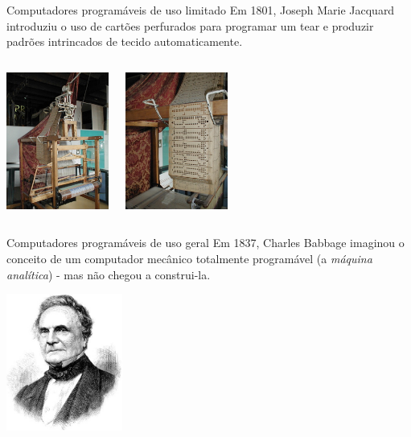 \documentclass[hyperref={pdfpagelabels=false}]{beamer}
\begin{document}
\begin{frame}{Computadores programáveis de uso limitado}
  Em 1801, Joseph Marie Jacquard introduziu o uso de cartões perfurados para programar um tear e produzir padrões intrincados de tecido automaticamente.
  \vspace{0.4cm}
  \begin{center}
    \begin{columns}
      \column{5cm}
			\begin{center}
			  \includegraphics[height=4.5cm]{img/jacquard.jpg}
			\end{center}
      \column{5cm}
			\begin{center}
			  \includegraphics[height=4.5cm]{img/jacquard_cartao.jpg}
			\end{center}
    \end{columns}
  \end{center}
\end{frame}

\begin{frame}{Computadores programáveis de uso geral}
  Em 1837, Charles Babbage imaginou o conceito de um computador mecânico totalmente programável (a \emph{máquina analítica}) - mas não chegou a construi-la.
  \begin{center}
		\includegraphics[height=4.5cm]{img/CharlesBabbage.jpg}
	\end{center}
\end{frame}
\end{document}
